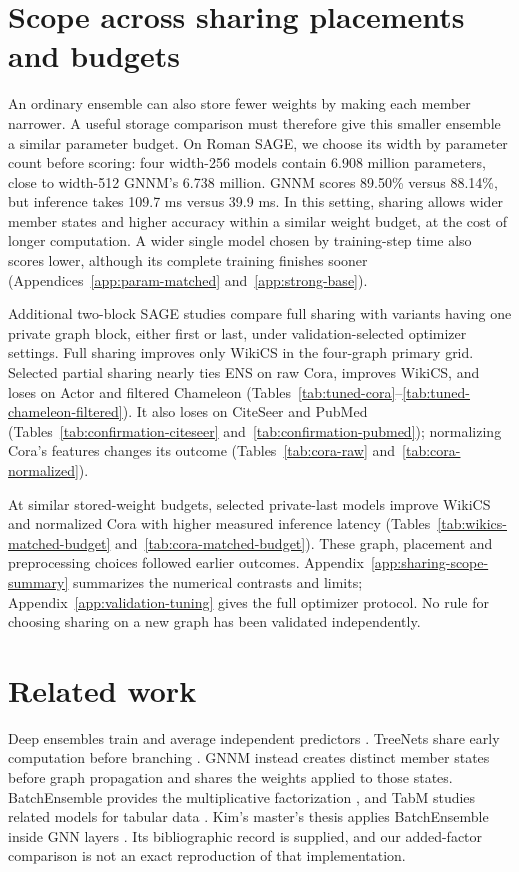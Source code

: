 \documentclass{article}
\begin{document}
\section{Scope across sharing placements and budgets}\label{sec:additional}
An ordinary ensemble can also store fewer weights by making each member narrower. A useful storage comparison must therefore give this smaller ensemble a similar parameter budget. On Roman SAGE, we choose its width by parameter count before scoring: four width-256 models contain 6.908 million parameters, close to width-512 GNNM's 6.738 million. GNNM scores 89.50\% versus 88.14\%, but inference takes 109.7 ms versus 39.9 ms. In this setting, sharing allows wider member states and higher accuracy within a similar weight budget, at the cost of longer computation. A wider single model chosen by training-step time also scores lower, although its complete training finishes sooner (Appendices~\ref{app:param-matched} and~\ref{app:strong-base}).

Additional two-block SAGE studies compare full sharing with variants having one private graph block, either first or last, under validation-selected optimizer settings. Full sharing improves only WikiCS in the four-graph primary grid. Selected partial sharing nearly ties ENS on raw Cora, improves WikiCS, and loses on Actor and filtered Chameleon (Tables~\ref{tab:tuned-cora}--\ref{tab:tuned-chameleon-filtered}). It also loses on CiteSeer and PubMed (Tables~\ref{tab:confirmation-citeseer} and~\ref{tab:confirmation-pubmed}); normalizing Cora's features changes its outcome (Tables~\ref{tab:cora-raw} and~\ref{tab:cora-normalized}).

At similar stored-weight budgets, selected private-last models improve WikiCS and normalized Cora with higher measured inference latency (Tables~\ref{tab:wikics-matched-budget} and~\ref{tab:cora-matched-budget}). These graph, placement and preprocessing choices followed earlier outcomes. Appendix~\ref{app:sharing-scope-summary} summarizes the numerical contrasts and limits; Appendix~\ref{app:validation-tuning} gives the full optimizer protocol. No rule for choosing sharing on a new graph has been validated independently.

\section{Related work}
Deep ensembles train and average independent predictors \citep{lakshminarayanan2017simple}. TreeNets share early computation before branching \citep{lee2015heads}. GNNM instead creates distinct member states before graph propagation and shares the weights applied to those states. BatchEnsemble provides the multiplicative factorization \citep{wen2020batchensemble}, and TabM studies related models for tabular data \citep{gorishniy2025tabm}. Kim's master's thesis applies BatchEnsemble inside GNN layers \citep{kim2023efficient}. Its bibliographic record is supplied, and our added-factor comparison is not an exact reproduction of that implementation.
\end{document}

